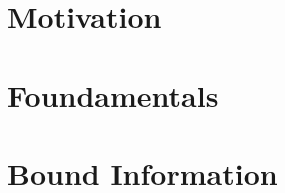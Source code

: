 \documentclass[titlepage]{report}
\begin{document}

\tableofcontents

%

\chapter{Motivation}

		
\chapter{Foundamentals}

		
\chapter{Bound Information}

	
%

%
\printbibliography
\end{document}
